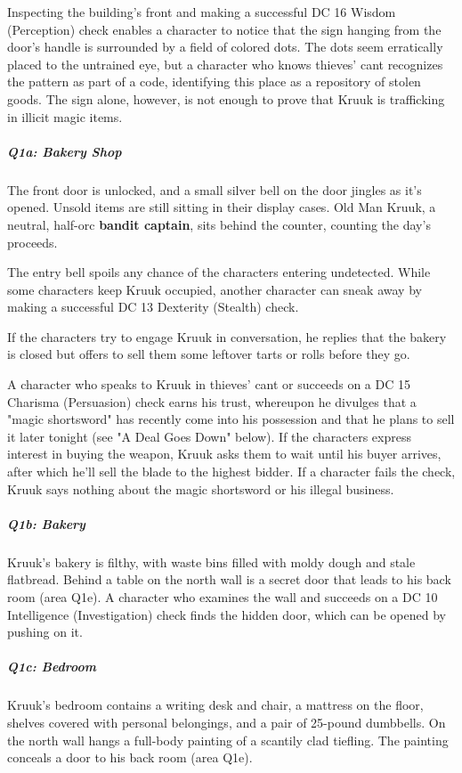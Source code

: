 \documentclass[10pt,a4paper,twoside,fancy,bg=print,twocolumn,openany,nodeprecatedcode]{dndbook}
\begin{document}
Inspecting the building's front and making a successful DC 16 Wisdom (Perception) check enables a character to notice that the sign hanging from the door's handle is surrounded by a field of colored dots. The dots seem erratically placed to the untrained eye, but a character who knows thieves' cant recognizes the pattern as part of a code, identifying this place as a repository of stolen goods. The sign alone, however, is not enough to prove that Kruuk is trafficking in illicit magic items.

\subparagraph{Q1a: Bakery Shop}
The front door is unlocked, and a small silver bell on the door jingles as it's opened. Unsold items are still sitting in their display cases. Old Man Kruuk, a neutral, half-orc \textbf{bandit captain}, sits behind the counter, counting the day's proceeds.

The entry bell spoils any chance of the characters entering undetected. While some characters keep Kruuk occupied, another character can sneak away by making a successful DC 13 Dexterity (Stealth) check.

If the characters try to engage Kruuk in conversation, he replies that the bakery is closed but offers to sell them some leftover tarts or rolls before they go.

A character who speaks to Kruuk in thieves' cant or succeeds on a DC 15 Charisma (Persuasion) check earns his trust, whereupon he divulges that a "magic shortsword" has recently come into his possession and that he plans to sell it later tonight (see "A Deal Goes Down" below). If the characters express interest in buying the weapon, Kruuk asks them to wait until his buyer arrives, after which he'll sell the blade to the highest bidder. If a character fails the check, Kruuk says nothing about the magic shortsword or his illegal business.

\subparagraph{Q1b: Bakery}
Kruuk's bakery is filthy, with waste bins filled with moldy dough and stale flatbread. Behind a table on the north wall is a secret door that leads to his back room (area Q1e). A character who examines the wall and succeeds on a DC 10 Intelligence (Investigation) check finds the hidden door, which can be opened by pushing on it.

\subparagraph{Q1c: Bedroom}
Kruuk's bedroom contains a writing desk and chair, a mattress on the floor, shelves covered with personal belongings, and a pair of 25-pound dumbbells. On the north wall hangs a full-body painting of a scantily clad tiefling. The painting conceals a door to his back room (area Q1e).
\end{document}
